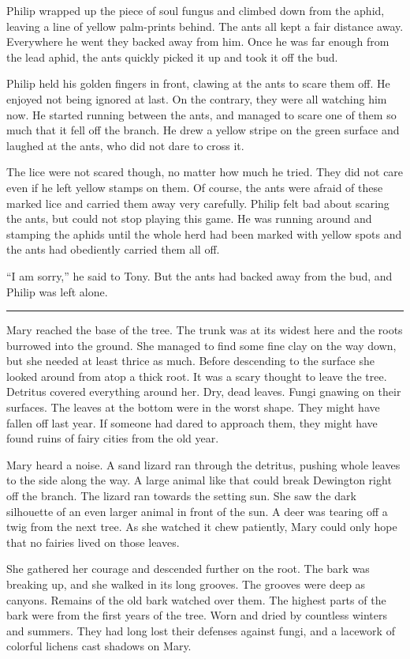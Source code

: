 \documentclass[10pt, draft]{memoir}
\renewcommand{\pfbreakdisplay}{\bigskip \ding{166} \bigskip}
\newcommand{\secbreak}{\fancybreak{\pfbreakdisplay}}
\begin{document}
Philip wrapped up the piece of soul fungus and climbed down from the aphid,
leaving a line of yellow palm-prints behind. The ants all kept a fair distance
away. Everywhere he went they backed away from him. Once he was far enough from
the lead aphid, the ants quickly picked it up and took it off the bud.

Philip held his golden fingers in front, clawing at the ants to scare them off.
He enjoyed not being ignored at last. On the contrary, they were all watching
him now. He started running between the ants, and managed to scare one of them
so much that it fell off the branch. He drew a yellow stripe on the green
surface and laughed at the ants, who did not dare to cross it.

The lice were not scared though, no matter how much he tried.  They did not
care even if he left yellow stamps on them. Of course, the ants were afraid of
these marked lice and carried them away very carefully. Philip felt bad about
scaring the ants, but could not stop playing this game. He was running around
and stamping the aphids until the whole herd had been marked with yellow spots
and the ants had obediently carried them all off.

``I am sorry,'' he said to Tony. But the ants had backed away from the bud, and
Philip was left alone.

\secbreak

Mary reached the base of the tree. The trunk was at its widest here and the
roots burrowed into the ground. She managed to find some fine clay on the way
down, but she needed at least thrice as much. Before descending to the surface
she looked around from atop a thick root. It was a scary thought to leave the
tree. Detritus covered everything around her. Dry, dead leaves. Fungi gnawing
on their surfaces. The leaves at the bottom were in the worst shape. They might
have fallen off last year. If someone had dared to approach them, they might
have found ruins of fairy cities from the old year.

Mary heard a noise. A sand lizard ran through the detritus, pushing whole
leaves to the side along the way. A large animal like that could break
Dewington right off the branch. The lizard ran towards the setting sun. She saw
the dark silhouette of an even larger animal in front of the sun. A deer was
tearing off a twig from the next tree. As she watched it chew patiently, Mary
could only hope that no fairies lived on those leaves.

She gathered her courage and descended further on the root. The bark was
breaking up, and she walked in its long grooves. The grooves were deep as
canyons. Remains of the old bark watched over them. The highest parts of the
bark were from the first years of the tree. Worn and dried by countless winters
and summers. They had long lost their defenses against fungi, and a lacework of
colorful lichens cast shadows on Mary.
\end{document}
